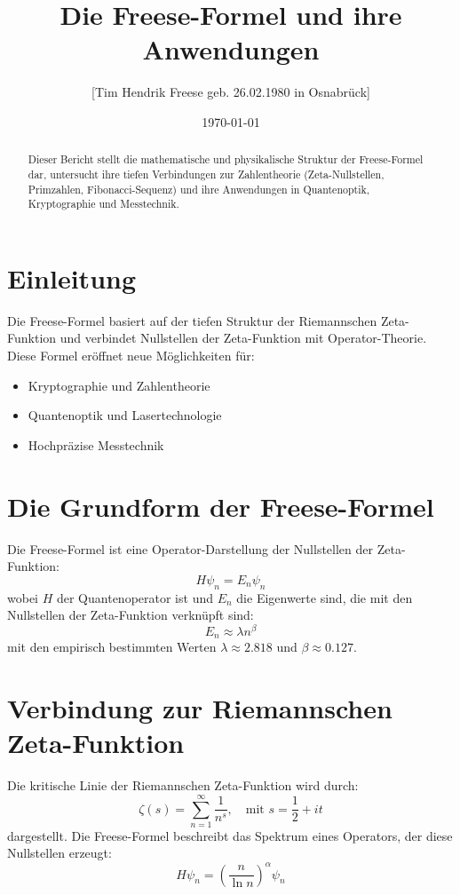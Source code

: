 \documentclass[a4paper,12pt]{article}
\title{Die Freese-Formel und ihre Anwendungen}
\author{[Tim Hendrik Freese geb. 26.02.1980 in Osnabrück]}
\date{\today}
\begin{document}
\maketitle

\begin{abstract}
Dieser Bericht stellt die mathematische und physikalische Struktur der Freese-Formel dar, untersucht ihre tiefen Verbindungen zur Zahlentheorie (Zeta-Nullstellen, Primzahlen, Fibonacci-Sequenz) und ihre Anwendungen in Quantenoptik, Kryptographie und Messtechnik.
\end{abstract}

\section{Einleitung}
Die Freese-Formel basiert auf der tiefen Struktur der Riemannschen Zeta-Funktion und verbindet Nullstellen der Zeta-Funktion mit Operator-Theorie. Diese Formel eröffnet neue Möglichkeiten für:
\begin{itemize}
    \item Kryptographie und Zahlentheorie
    \item Quantenoptik und Lasertechnologie
    \item Hochpräzise Messtechnik
\end{itemize}

\section{Die Grundform der Freese-Formel}
Die Freese-Formel ist eine Operator-Darstellung der Nullstellen der Zeta-Funktion:
\begin{equation}
    H \psi_n = E_n \psi_n
\end{equation}
wobei $H$ der Quantenoperator ist und $E_n$ die Eigenwerte sind, die mit den Nullstellen der Zeta-Funktion verknüpft sind:
\begin{equation}
    E_n \approx \lambda n^\beta
\end{equation}
mit den empirisch bestimmten Werten $\lambda \approx 2.818$ und $\beta \approx 0.127$.

\section{Verbindung zur Riemannschen Zeta-Funktion}
Die kritische Linie der Riemannschen Zeta-Funktion wird durch:
\begin{equation}
    \zeta(s) = \sum_{n=1}^{\infty} \frac{1}{n^s}, \quad \text{mit } s = \frac{1}{2} + i t
\end{equation}
dargestellt. Die Freese-Formel beschreibt das Spektrum eines Operators, der diese Nullstellen erzeugt:
\begin{equation}
    H \psi_n = \left(\frac{n}{\ln n}\right)^\alpha \psi_n
\end{equation}
\end{document}
